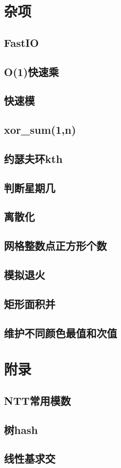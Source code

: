 ﻿\documentclass[a4paper,twocolumn]{article}
\begin{document}
\section{杂项}
\subsection{FastIO}

\subsection{O(1)快速乘}

\subsection{快速模}

\subsection{xor\_sum(1,n)}

\subsection{约瑟夫环kth}

\subsection{判断星期几}

\subsection{离散化}

\subsection{网格整数点正方形个数}

\subsection{模拟退火}

\subsection{矩形面积并}

\subsection{维护不同颜色最值和次值}

\section{附录}
\subsection{NTT常用模数}
\begin{spacing}{1.5}

\end{spacing}
\subsection{树hash}
\begin{spacing}{1.5}

\end{spacing}
\subsection{线性基求交}

\end{document}
